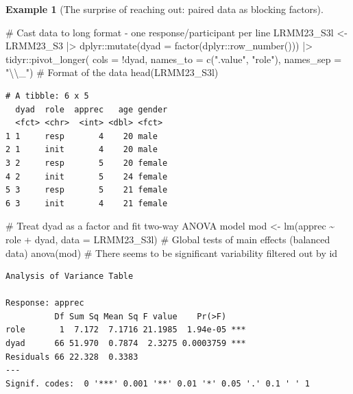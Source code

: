 \documentclass[
  11pt,
  letterpaper,
]{scrbook}
\newenvironment{Shaded}{\begin{snugshade}}{\end{snugshade}}
\newcommand{\AttributeTok}[1]{\textcolor[rgb]{0.40,0.45,0.13}{#1}}
\newcommand{\CommentTok}[1]{\textcolor[rgb]{0.37,0.37,0.37}{#1}}
\newcommand{\FunctionTok}[1]{\textcolor[rgb]{0.28,0.35,0.67}{#1}}
\newcommand{\NormalTok}[1]{\textcolor[rgb]{0.00,0.23,0.31}{#1}}
\newcommand{\OtherTok}[1]{\textcolor[rgb]{0.00,0.23,0.31}{#1}}
\newcommand{\SpecialCharTok}[1]{\textcolor[rgb]{0.37,0.37,0.37}{#1}}
\newcommand{\StringTok}[1]{\textcolor[rgb]{0.13,0.47,0.30}{#1}}
\theoremstyle{definition}
\newtheorem{example}{Example}[chapter]
\theoremstyle{remark}
\begin{document}
\begin{example}[The surprise of reaching out: paired data as blocking
factors]
\begin{Shaded}
\begin{Highlighting}[]
\CommentTok{\# Cast data to long format {-} one response/participant per line}
\NormalTok{LRMM23\_S3l }\OtherTok{\textless{}{-}}\NormalTok{ LRMM23\_S3 }\SpecialCharTok{|\textgreater{}}
\NormalTok{  dplyr}\SpecialCharTok{::}\FunctionTok{mutate}\NormalTok{(}\AttributeTok{dyad =} \FunctionTok{factor}\NormalTok{(dplyr}\SpecialCharTok{::}\FunctionTok{row\_number}\NormalTok{())) }\SpecialCharTok{|\textgreater{}} 
\NormalTok{  tidyr}\SpecialCharTok{::}\FunctionTok{pivot\_longer}\NormalTok{(}
    \AttributeTok{cols =} \SpecialCharTok{!}\NormalTok{dyad, }
    \AttributeTok{names\_to =} \FunctionTok{c}\NormalTok{(}\StringTok{".value"}\NormalTok{, }\StringTok{"role"}\NormalTok{),}
    \AttributeTok{names\_sep =} \StringTok{"}\SpecialCharTok{\textbackslash{}\textbackslash{}}\StringTok{\_"}\NormalTok{)}
\CommentTok{\# Format of the data}
\FunctionTok{head}\NormalTok{(LRMM23\_S3l)}
\end{Highlighting}
\end{Shaded}

\begin{verbatim}
# A tibble: 6 x 5
  dyad  role  apprec   age gender
  <fct> <chr>  <int> <dbl> <fct> 
1 1     resp       4    20 male  
2 1     init       4    20 male  
3 2     resp       5    20 female
4 2     init       5    24 female
5 3     resp       5    21 female
6 3     init       4    21 female
\end{verbatim}

\begin{Shaded}
\begin{Highlighting}[]
\CommentTok{\# Treat dyad as a factor and fit two{-}way ANOVA model}
\NormalTok{mod }\OtherTok{\textless{}{-}} \FunctionTok{lm}\NormalTok{(apprec }\SpecialCharTok{\textasciitilde{}}\NormalTok{ role }\SpecialCharTok{+}\NormalTok{ dyad, }\AttributeTok{data =}\NormalTok{ LRMM23\_S3l)}
\CommentTok{\# Global tests of main effects (balanced data)}
\FunctionTok{anova}\NormalTok{(mod) }\CommentTok{\# There seems to be significant variability filtered out by \textquotesingle{}id\textquotesingle{}}
\end{Highlighting}
\end{Shaded}

\begin{verbatim}
Analysis of Variance Table

Response: apprec
          Df Sum Sq Mean Sq F value    Pr(>F)    
role       1  7.172  7.1716 21.1985  1.94e-05 ***
dyad      66 51.970  0.7874  2.3275 0.0003759 ***
Residuals 66 22.328  0.3383                      
---
Signif. codes:  0 '***' 0.001 '**' 0.01 '*' 0.05 '.' 0.1 ' ' 1
\end{verbatim}


\end{example}
\end{document}
